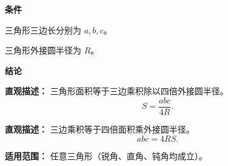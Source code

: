 \begin{statementbox}
	\textbf{\textcolor{CStatement}{条件}}
	\begin{description}[style=nextline, leftmargin=2.8em, labelsep=0.5em, itemsep=0.35em]
		\item[\textbf{\textcolor{CStatement}{条件 1（三角形三边长）：}}] 三角形三边长分别为 $a,b,c$。
		\item[\textbf{\textcolor{CStatement}{条件 2（外接圆半径）：}}] 三角形外接圆半径为 $R$。
	\end{description}

	\textbf{\textcolor{CStatement}{结论}}
	\begin{description}[style=nextline, leftmargin=2.8em, labelsep=0.5em, itemsep=0.45em]
		\item[\textbf{\textcolor{CStatement}{结论一（面积公式）：}}]
			\textbf{\textcolor{CStatement}{直观描述：}}
			三角形面积等于三边乘积除以四倍外接圆半径。
			\[
				S = \frac{abc}{4R}.
			\]

		\item[\textbf{\textcolor{CStatement}{等价形式：}}]
			\textbf{\textcolor{CStatement}{直观描述：}}
			三边乘积等于四倍面积乘外接圆半径。
			\[
				abc = 4RS.
			\]
	\end{description}

	\medskip
	\textbf{\textcolor{CStatement}{适用范围：}}
	任意三角形（锐角、直角、钝角均成立）。
\end{statementbox}
